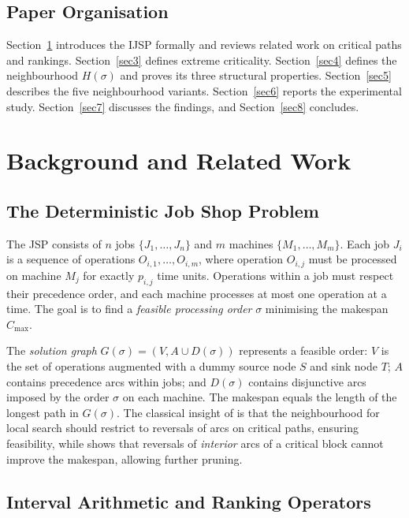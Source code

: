 \documentclass[preprint,12pt]{elsarticle}
\begin{document}
\subsection{Paper Organisation}
\label{sec1.2}
Section~\ref{sec2} introduces the IJSP formally and reviews related work on critical paths and rankings. Section~\ref{sec3} defines extreme criticality. Section~\ref{sec4} defines the neighbourhood $H(\sigma)$ and proves its three structural properties. Section~\ref{sec5} describes the five neighbourhood variants. Section~\ref{sec6} reports the experimental study. Section~\ref{sec7} discusses the findings, and Section~\ref{sec8} concludes.


\section{Background and Related Work}
\label{sec2}

\subsection{The Deterministic Job Shop Problem}
\label{sec2.1}

The JSP consists of $n$ jobs $\{J_1,\ldots,J_n\}$ and $m$ machines $\{M_1,\ldots,M_m\}$. Each job $J_i$ is a sequence of operations $O_{i,1},\ldots,O_{i,m}$, where operation $O_{i,j}$ must be processed on machine $M_j$ for exactly $p_{i,j}$ time units. Operations within a job must respect their precedence order, and each machine processes at most one operation at a time. The goal is to find a \emph{feasible processing order} $\sigma$ minimising the makespan $C_{\max}$.

The \emph{solution graph} $G(\sigma) = (V, A \cup D(\sigma))$ represents a feasible order: $V$ is the set of operations augmented with a dummy source node $S$ and sink node $T$; $A$ contains precedence arcs within jobs; and $D(\sigma)$ contains disjunctive arcs imposed by the order $\sigma$ on each machine. The makespan equals the length of the longest path in $G(\sigma)$. The classical insight of \cite{vanLaarhoven1992} is that the neighbourhood for local search should restrict to reversals of arcs on critical paths, ensuring feasibility, while \cite{Nowicki1996} shows that reversals of \emph{interior} arcs of a critical block cannot improve the makespan, allowing further pruning.

\subsection{Interval Arithmetic and Ranking Operators}
\label{sec2.2}
\end{document}

